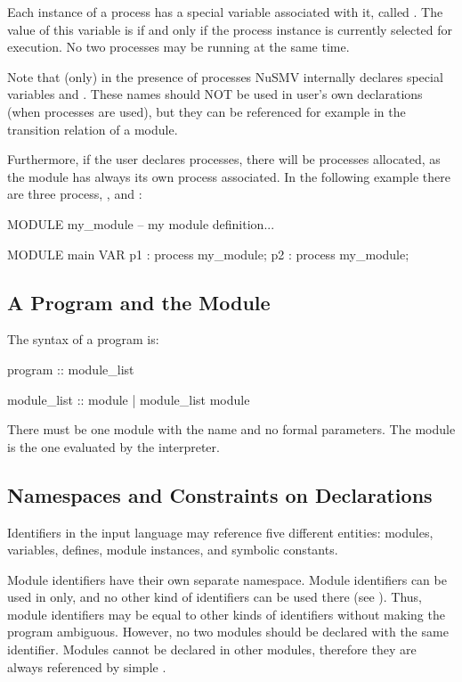 Each instance of a process has a special \Boolean variable associated
with it, called .
%
The value of this variable is  if and only if the process
instance is currently selected for execution.
%
No two processes may be running at the same time.

Note that (only) in the presence of processes NuSMV internally
declares special variables 
and . These names should NOT be used in
user's own declarations (when processes are used), but they can be
referenced for example in the transition relation of a module.

Furthermore, if the user declares  processes, there will be
 processes allocated, as the module  has always its 
own process associated. In the following example there are three
process, ,  and :
%
\begin{nusmvCode}
MODULE my_module
  -- my module definition...

MODULE main
  VAR 
    p1 : process my_module;
    p2 : process my_module;

\end{nusmvCode}
%

\subsection{A Program and the  Module}
\label{Main Module}
%
The syntax of a \nusmv program is:
%
\begin{Grammar}
program :: module_list

module_list ::
          module
        | module_list module
\end{Grammar}
%
There must be one module with the name  and no formal
parameters.
%
The module  is the one evaluated by the interpreter.

\subsection{Namespaces and Constraints on Declarations}
\label{Namespaces}
%
Identifiers in the \nusmv input language may reference five different
entities: modules, variables, defines, module instances, and symbolic
constants.

Module identifiers have their own separate namespace. 
%
Module identifiers can be used in 
only, and no other kind of identifiers can be used there (see
).
%
Thus, module identifiers may be equal to other kinds of identifiers
without making the program ambiguous. 
%
However, no two modules should be declared with the same
identifier. 
%
Modules cannot be declared in other modules, therefore they are always
referenced by simple .


